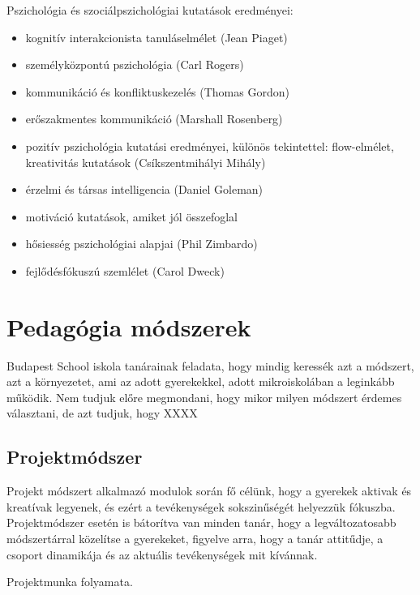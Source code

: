 Pszichológia és szociálpszichológiai kutatások eredményei:

\begin{itemize}

\item
  kognitív interakcionista tanuláselmélet (Jean Piaget)
\item
  személyközpontú pszichológia (Carl Rogers)
\item
  kommunikáció és konfliktuskezelés (Thomas Gordon)
\item
  erőszakmentes kommunikáció (Marshall Rosenberg)
\item
  pozitív pszichológia kutatási eredményei, különös tekintettel:
  flow-elmélet, kreativitás kutatások (Csíkszentmihályi Mihály)
\item
  érzelmi és társas intelligencia (Daniel Goleman)
\item motiváció kutatások, amiket jól összefoglal \citep{pink2011drive}
\item
  hősiesség pszichológiai alapjai (Phil Zimbardo)
\item
  fejlődésfókuszú szemlélet (Carol Dweck)
\end{itemize}

\section{Pedagógia
módszerek}
Budapest School iskola tanárainak feladata, hogy mindig keressék azt a módszert, azt a környezetet, ami az adott gyerekekkel, adott mikroiskolában a leginkább működik. Nem tudjuk előre megmondani, hogy mikor milyen módszert érdemes választani, de azt tudjuk, hogy XXXX





\subsection{Projektmódszer}
Projekt módszert alkalmazó modulok során fő célünk, hogy a gyerekek aktivak és kreatívak legyenek, és ezért a tevékenységek sokszinűségét helyezzük fókuszba. Projektmódszer esetén is bátorítva van minden tanár, hogy a legváltozatosabb módszertárral közelítse a gyerekeket, figyelve arra, hogy a tanár attitűdje, a csoport dinamikája és az aktuális tevékenységek mit kívánnak.

Projektmunka folyamata.

